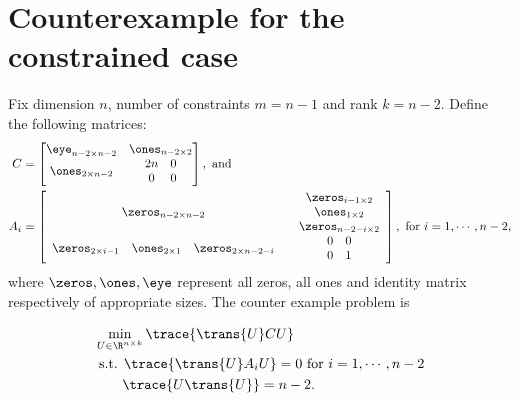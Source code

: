 \section{Counterexample for the constrained case}
Fix dimension $n$, number of constraints $m = n-1$ and rank $k= n-2$. Define the following matrices:
\begin{align*}
	C &= \begin{bmatrix}
	\eye_{n-2 \times n-2}	&	\ones_{n-2 \times 2} \\
	\ones_{2 \times n-2}	&	\begin{array}{cc}
	2n	& 0 \\ 0 & 0
	\end{array}
	\end{bmatrix},
	\mbox{ and } \\
	A_i &= \begin{bmatrix}
	\zeros_{n-2\times n-2} & \begin{array}{c}
	\zeros_{i-1 \times 2} \\ \ones_{1 \times 2} \\ \zeros_{n-2-i \times 2}
	\end{array} \\
	\begin{array}{ccc}
	\zeros_{2 \times i-1} & \ones_{2 \times 1} & \zeros_{2 \times n-2-i } \end{array} & \begin{array}{cc}
	0	& 0 \\ 0 & 1
	\end{array}
	\end{bmatrix}, \mbox{ for } i = 1,\cdots, n-2,
\end{align*}
where $\zeros, \ones, \eye$ represent all zeros, all ones and identity matrix respectively of appropriate sizes. The counter example problem is

\begin{align}
	&\min_{U \in \R^{n\times k}} \trace{\trans{U} C U} \nonumber \\
	& \mbox{ s.t. } \trace{\trans{U} A_i U} = 0 \mbox{ for } i = 1,\cdots, n-2 \nonumber \\
	&\qquad \trace{U \trans{U}} = n-2. \label{eq:counter-constrained}
\end{align}

